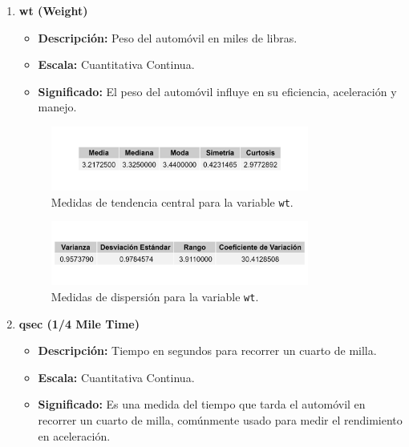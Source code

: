 \documentclass{article}
\begin{document}
\begin{enumerate}
    \item \textbf{wt (Weight)}

          \begin{itemize}
              \item \textbf{Descripción:} Peso del automóvil en miles de libras.
              \item \textbf{Escala:} Cuantitativa Continua.
              \item \textbf{Significado:} El peso del automóvil influye en su eficiencia, aceleración y manejo.
          \end{itemize}

          \begin{figure}[H]
              \centering
              \includegraphics[width=0.8\textwidth]{MTC/wt_central.png}
              \caption{Medidas de tendencia central para la variable \texttt{wt}.}
              \label{fig:wt_central}
          \end{figure}

          \begin{figure}[H]
              \centering
              \includegraphics[width=0.8\textwidth]{MTC/wt_dispersion.png}
              \caption{Medidas de dispersión para la variable \texttt{wt}.}
              \label{fig:wt_dispersion}
          \end{figure}

    \item \textbf{qsec (1/4 Mile Time)}

          \begin{itemize}
              \item \textbf{Descripción:} Tiempo en segundos para recorrer un cuarto de milla.
              \item \textbf{Escala:} Cuantitativa Continua.
              \item \textbf{Significado:} Es una medida del tiempo que tarda el automóvil en recorrer un cuarto de milla, comúnmente usado para medir el rendimiento en aceleración.
          \end{itemize}


\end{enumerate}
\end{document}
